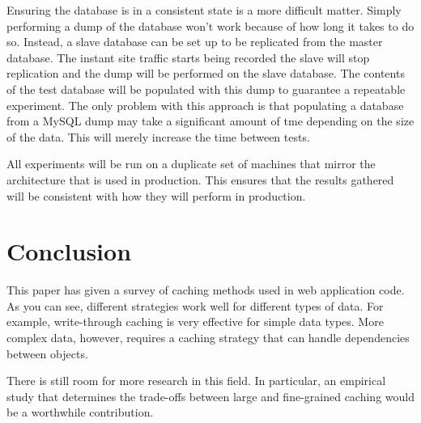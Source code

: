 \documentclass[12pt]{ucthesis}
\begin{document}
Ensuring the database is in a consistent state is a more difficult matter.
Simply performing a dump of the database won't work because of how long it takes to do so.
Instead, a slave database can be set up to be replicated from the master database.
The instant site traffic starts being recorded the slave will stop replication and the dump will be performed on the slave database.
The contents of the test database will be populated with this dump to guarantee a repeatable experiment.
The only problem with this approach is that populating a database from a MySQL dump may take a significant amount of tme depending on the size of the data.
This will merely increase the time between tests.

All experiments will be run on a duplicate set of machines that mirror the architecture that is used in production.
This ensures that the results gathered will be consistent with how they will perform in production.

\chapter{Conclusion}
\label{conclusion}
This paper has given a survey of caching methods used in web application code.
As you can see, different strategies work well for different types of data.
For example, write-through caching is very effective for simple data types.
More complex data, however, requires a caching strategy that can handle dependencies between objects.

There is still room for more research in this field.
In particular, an empirical study that determines the trade-offs between large and fine-grained caching would be a worthwhile contribution.



\clearpage


\end{document}

